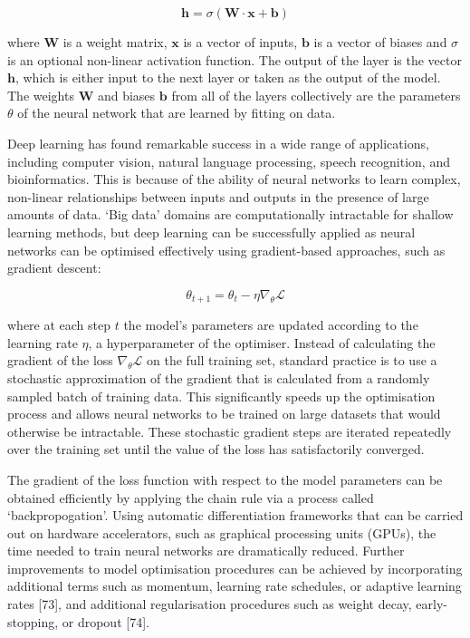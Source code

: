 \begin{equation}
    \textbf{h} = \sigma(\mathbf{W} \cdot \mathbf{x} + \mathbf{b})
\end{equation}

where $\mathbf{W}$ is a weight matrix, $\mathbf{x}$ is a vector of inputs, $\mathbf{b}$ is a vector of biases and $\sigma$ is an optional non-linear activation function. The output of the layer is the vector $\mathbf{h}$, which is either input to the next layer or taken as the output of the model. The weights $\mathbf{W}$ and biases $\mathbf{b}$ from all of the layers collectively are the parameters $\theta$ of the neural network that are learned by fitting on data.

Deep learning has found remarkable success in a wide range of applications, including computer vision, natural language processing, speech recognition, and bioinformatics. This is because of the ability of neural networks to learn complex, non-linear relationships between inputs and outputs in the presence of large amounts of data. `Big data' domains are computationally intractable for shallow learning methods, but deep learning can be successfully applied as neural networks can be optimised effectively using  gradient-based approaches, such as gradient descent:

\begin{equation}
    \theta_{t+1} = \theta_t - \eta \nabla_{\theta} \mathcal{L}
\end{equation}

where at each step $t$ the model's parameters are updated according to the learning rate $\eta$, a hyperparameter of the optimiser. Instead of calculating the gradient of the loss $\nabla_{\theta}\mathcal{L}$ on the full training set, standard practice is to use a stochastic approximation of the gradient that is calculated from a randomly sampled batch of training data. This significantly speeds up the optimisation process and allows neural networks to be trained on large datasets that would otherwise be intractable. These stochastic gradient steps are iterated repeatedly over the training set until the value of the loss has satisfactorily converged. 

The gradient of the loss function with respect to the model parameters can be obtained efficiently by applying the chain rule via a process called `backpropogation'. Using automatic differentiation frameworks that can be carried out on hardware accelerators, such as graphical processing units (GPUs), the time needed to train neural networks are dramatically reduced. Further improvements to model optimisation procedures can be achieved by incorporating additional terms such as momentum, learning rate schedules, or adaptive learning rates [73], and additional regularisation procedures such as weight decay, early-stopping, or dropout [74].

